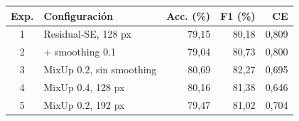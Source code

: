 \begin{tabular}{@{}clrrr@{}}
\toprule
\textbf{Exp.} & \textbf{Configuración} & \textbf{Acc. (\%)} & \textbf{F1 (\%)} & \textbf{CE} \\
\midrule
1 & Residual-SE, 128 px & 79,15 & 80,18 & 0,809 \\
2 & + smoothing 0.1 & 79,04 & 80,73 & 0,800 \\
3 & MixUp 0.2, sin smoothing & 80,69 & 82,27 & 0,695 \\
4 & MixUp 0.4, 128 px & 80,16 & 81,38 & 0,646 \\
5 & MixUp 0.2, 192 px & 79,47 & 81,02 & 0,704 \\
\bottomrule
\end{tabular}
